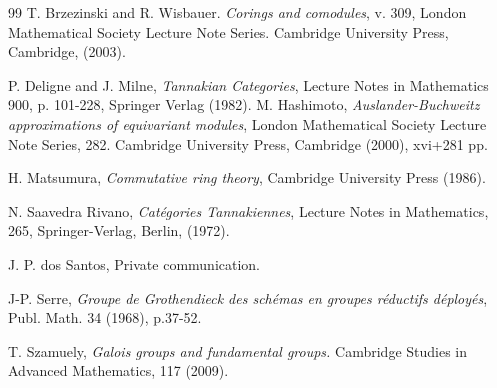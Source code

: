 \documentclass[12pt]{amsart}
\theoremstyle{plain}
\theoremstyle{definition}
\numberwithin{thm}{section}
\begin{document}
\begin{thebibliography}{99}
 T. Brzezinski and R. Wisbauer. \textit{Corings and comodules}, v. 309, London Mathematical Society Lecture Note Series. Cambridge University Press, Cambridge, (2003).

  P. Deligne and J. Milne, \textit{ Tannakian Categories}, Lecture Notes in Mathematics 900, p. 101-228, Springer Verlag (1982). 
 M. Hashimoto, \textit{Auslander-Buchweitz approximations of equivariant modules}, 
London Mathematical Society Lecture Note Series, 282. Cambridge University Press, Cambridge (2000), xvi+281 pp.

 H. Matsumura, \textit{Commutative ring theory}, Cambridge University Press (1986).


  N.  Saavedra  Rivano,  \textit{Cat\'egories  Tannakiennes},  Lecture  Notes  in  Mathematics, 265, Springer-Verlag, Berlin, (1972).

 J. P. dos Santos, Private communication.

 J-P. Serre,  \textit{Groupe de Grothendieck des sch\'emas en groupes r\'eductifs d\'eploy\'es}, Publ. Math. 34 (1968), p.37-52.

 T. Szamuely, \textit{Galois groups and fundamental groups.} 
Cambridge Studies in Advanced Mathematics, 117 (2009). 

\end{thebibliography}
\end{document}
